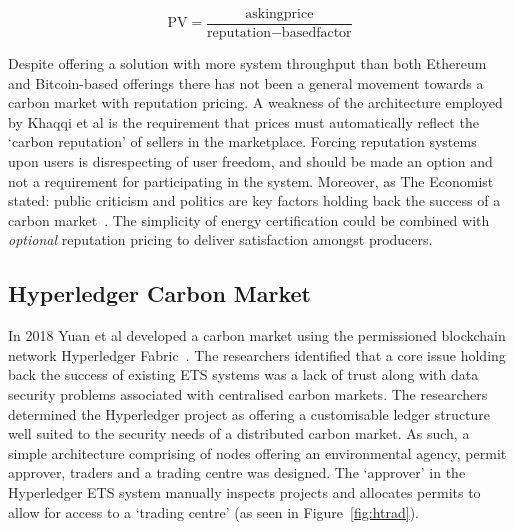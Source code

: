 \begin{equation}
    \text{PV} =
    \frac{\text{askingprice}}
    {\text{reputation} - \text{basedfactor}}
    \label{eqn:pv}
\end{equation}

Despite offering a solution with more
system throughput than both Ethereum and Bitcoin-based offerings
there has not been a general movement towards
a carbon market with reputation pricing. A weakness of the
architecture employed by Khaqqi et al is the requirement that
prices must automatically reflect the `carbon reputation' of
sellers in the marketplace. Forcing reputation systems
upon users is disrespecting of user freedom, and
should be made an option and not a requirement for
participating in the system. Moreover, as The Economist
stated: public criticism and politics are key factors holding
back the success of a carbon market~\cite{EconE}.
The simplicity of energy certification could be
combined with \textit{optional} reputation pricing to deliver satisfaction
amongst producers.

\subsection{Hyperledger Carbon Market}
In 2018 Yuan et al developed a carbon market using the
permissioned blockchain network Hyperledger Fabric~\cite{article}.
The researchers identified that a core issue holding back the
success of existing ETS systems was a lack of trust
along with data security problems associated with centralised carbon
markets.
The researchers determined the Hyperledger project as offering
a customisable ledger structure well suited to the security
needs of a distributed carbon market. As such, a simple
architecture comprising of nodes offering an environmental
agency, permit approver, traders and a trading centre was designed. The
`approver' in the Hyperledger ETS system manually inspects
projects and allocates permits to allow for access to a `trading
centre' (as seen in Figure~\ref{fig:htrad}).

